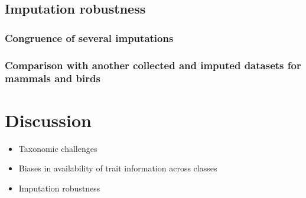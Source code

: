 \subsection{Imputation robustness}

\subsubsection{Congruence of several imputations}

\subsubsection{Comparison with another collected and imputed datasets for mammals and birds}

\pagebreak
\section{Discussion}
\begin{itemize}
\item Taxonomic challenges
\item Biases in availability of trait information across classes
\item Imputation robustness 
\end{itemize}


